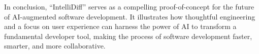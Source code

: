 In conclusion, ``IntelliDiff'' serves as a compelling proof-of-concept for the future of AI-augmented software development. It illustrates how thoughtful engineering and a focus on user experience can harness the power of AI to transform a fundamental developer tool, making the process of software development faster, smarter, and more collaborative. 